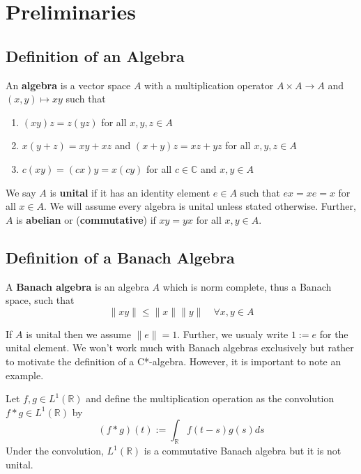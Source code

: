 \section{Preliminaries}
\label{sec:prelim}
\subsection{Definition of an Algebra}
\begin{definition}
    An \textbf{algebra} is a vector space $A$ with a multiplication operator
    $A \times A \to A$ and $(x,y) \mapsto xy$ such that
    \begin{enumerate}
        \item $(xy)z = z(yz)$ for all $x,y,z \in A$
        \item $x(y+z) = xy + xz$ and $(x+y)z = xz+yz$ for all $x,y,z \in A$
        \item $c(xy) = (cx)y = x(cy)$ for all $c \in \mathbb{C}$ and $x,y \in A$
    \end{enumerate}
\end{definition}
We say $A$ is \textbf{unital} if it has an identity element $e \in A$ such that
$ex = xe = x$ for all $x \in A$. We will assume every algebra is unital unless stated
otherwise. Further, $A$ is \textbf{abelian} or (\textbf{commutative})
if $xy=yx$ for all $x,y \in A$.

\subsection{Definition of a Banach Algebra}
\begin{definition}
    A \textbf{Banach algebra} is an algebra $A$ which is norm complete, thus a Banach
    space, such that
    \begin{equation*}
        \| xy \| \le \|x\| \|y\| \quad \forall x,y \in A
    \end{equation*}
\end{definition}
If $A$ is unital then we assume $\| e \| = 1$. Further, we usualy write $1:=e$ for
the unital element. We won't work much with Banach algebras exclusively but rather
to motivate the definition of a C*-algebra. However, it is important to note an example.
\begin{example}
    Let $f,g \in L^1(\mathbb{R})$ and define the multiplication operation as the convolution
    $f * g \in L^1 (\mathbb{R})$ by
    \begin{equation*}
        (f * g)(t) := \int_{\mathbb{R}} f(t-s)g(s)ds
    \end{equation*}
    Under the convolution, $L^1 (\mathbb{R})$ is a commutative Banach algebra but
    it is not unital.
\end{example}



